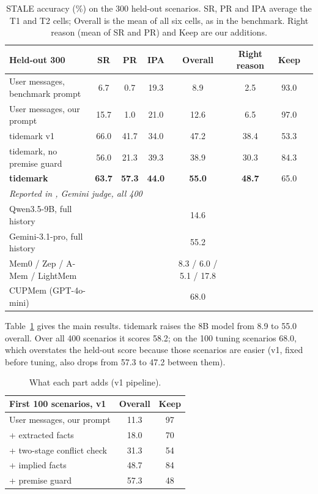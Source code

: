 \documentclass[10pt,twocolumn]{article}
\begin{document}
\begin{table}[t]
\centering
\begin{tabular}{lccccccc}
\toprule
Held-out 300 & SR & PR & IPA & \textbf{Overall} & Right reason & Keep \\
\midrule
User messages, benchmark prompt & 6.7 & 0.7 & 19.3 & 8.9 & 2.5 & 93.0 \\
User messages, our prompt & 15.7 & 1.0 & 21.0 & 12.6 & 6.5 & 97.0 \\
tidemark v1 & 66.0 & 41.7 & 34.0 & 47.2 & 38.4 & 53.3 \\
tidemark, no premise guard & 56.0 & 21.3 & 39.3 & 38.9 & 30.3 & 84.3 \\
\textbf{tidemark} & \textbf{63.7} & \textbf{57.3} & \textbf{44.0} & \textbf{55.0} & \textbf{48.7} & 65.0 \\
\midrule
\multicolumn{7}{l}{\textit{Reported in \cite{stale}, Gemini judge, all 400}} \\
Qwen3.5-9B, full history & & & & 14.6 & & \\
Gemini-3.1-pro, full history & & & & 55.2 & & \\
Mem0 / Zep / A-Mem / LightMem & & & & 8.3 / 6.0 / 5.1 / 17.8 & & \\
CUPMem (GPT-4o-mini) & & & & 68.0 & & \\
\bottomrule
\end{tabular}
\caption{STALE accuracy (\%) on the 300 held-out scenarios. SR, PR and IPA average the T1 and T2 cells; Overall is the
mean of all six cells, as in the benchmark. Right reason (mean of SR and PR) and Keep are our additions.}
\label{tab:main}
\end{table}

Table~\ref{tab:main} gives the main results. tidemark raises the 8B model from 8.9 to 55.0 overall. Over all 400
scenarios it scores 58.2; on the 100 tuning scenarios 68.0, which overstates the held-out score because those
scenarios are easier (v1, fixed before tuning, also drops from 57.3 to 47.2 between them).

\begin{table}[t]
\centering
\begin{tabular}{lcc}
\toprule
First 100 scenarios, v1 & Overall & Keep \\
\midrule
User messages, our prompt & 11.3 & 97 \\
+ extracted facts & 18.0 & 70 \\
+ two-stage conflict check & 31.3 & 54 \\
+ implied facts & 48.7 & 84 \\
+ premise guard & 57.3 & 48 \\
\bottomrule
\end{tabular}
\caption{What each part adds (v1 pipeline).}
\label{tab:ablation}
\end{table}
\end{document}
